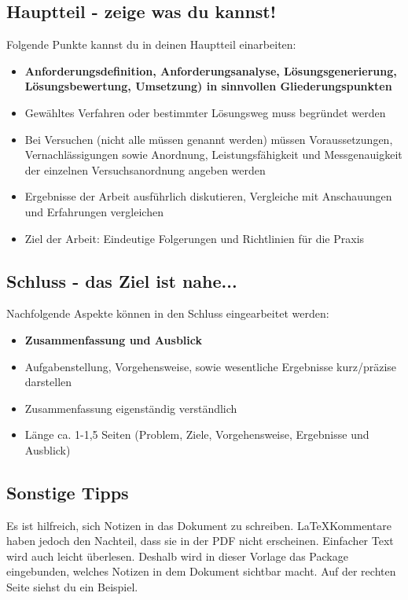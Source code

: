 \subsection{Hauptteil - zeige was du kannst!}
Folgende Punkte kannst du in deinen Hauptteil einarbeiten:
\begin{itemize}
\item \textbf{Anforderungsdefinition, Anforderungsanalyse, Lösungsgenerierung, Lösungsbewertung, Umsetzung) in sinnvollen Gliederungspunkten}
\item Gewähltes Verfahren oder bestimmter Lösungsweg muss begründet werden
\item Bei Versuchen (nicht alle müssen genannt werden) müssen Voraussetzungen, Vernachlässigungen sowie Anordnung, Leistungsfähigkeit und Messgenauigkeit der einzelnen Versuchsanordnung angeben werden
\item Ergebnisse der Arbeit ausführlich diskutieren, Vergleiche mit Anschauungen und Erfahrungen vergleichen
\item Ziel der Arbeit: Eindeutige Folgerungen und Richtlinien für die Praxis
\end{itemize}

\subsection{Schluss - das Ziel ist nahe...}
Nachfolgende Aspekte können in den Schluss eingearbeitet werden:
\begin{itemize}
\item \textbf{Zusammenfassung und Ausblick}
\item Aufgabenstellung, Vorgehensweise, sowie wesentliche Ergebnisse kurz/präzise darstellen
\item Zusammenfassung eigenständig verständlich
\item Länge ca. 1-1,5 Seiten (Problem, Ziele, Vorgehensweise, Ergebnisse und Ausblick)
\end{itemize}

\subsection{Sonstige Tipps}
Es ist hilfreich, sich Notizen in das Dokument zu schreiben.
\LaTeX Kommentare haben jedoch den Nachteil, dass sie in der PDF nicht erscheinen.
Einfacher Text wird auch leicht überlesen.
Deshalb wird in dieser Vorlage das Package  eingebunden, welches Notizen in dem Dokument sichtbar macht.
Auf der rechten Seite siehst du ein Beispiel.
